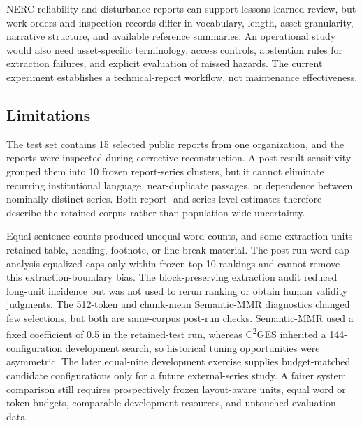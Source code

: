 \documentclass[information,article,submit,moreauthors]{Definitions/mdpi}
\newcommand{\cges}{C\textsuperscript{2}GES}
\begin{document}
NERC reliability and disturbance reports can support lessons-learned review, but work orders and inspection records differ in vocabulary, length, asset granularity, narrative structure, and available reference summaries. An operational study would also need asset-specific terminology, access controls, abstention rules for extraction failures, and explicit evaluation of missed hazards. The current experiment establishes a technical-report workflow, not maintenance effectiveness.

\subsection{Limitations}

The test set contains 15 selected public reports from one organization, and the reports were inspected during corrective reconstruction. A post-result sensitivity grouped them into 10 frozen report-series clusters, but it cannot eliminate recurring institutional language, near-duplicate passages, or dependence between nominally distinct series. Both report- and series-level estimates therefore describe the retained corpus rather than population-wide uncertainty.

Equal sentence counts produced unequal word counts, and some extraction units retained table, heading, footnote, or line-break material. The post-run word-cap analysis equalized caps only within frozen top-10 rankings and cannot remove this extraction-boundary bias. The block-preserving extraction audit reduced long-unit incidence but was not used to rerun ranking or obtain human validity judgments. The 512-token and chunk-mean Semantic-MMR diagnostics changed few selections, but both are same-corpus post-run checks. Semantic-MMR used a fixed coefficient of 0.5 in the retained-test run, whereas \cges{} inherited a 144-configuration development search, so historical tuning opportunities were asymmetric. The later equal-nine development exercise supplies budget-matched candidate configurations only for a future external-series study. A fairer system comparison still requires prospectively frozen layout-aware units, equal word or token budgets, comparable development resources, and untouched evaluation data.
\end{document}
